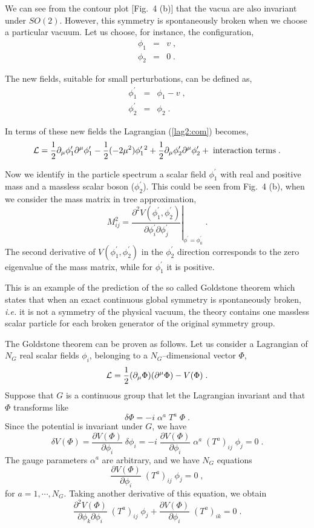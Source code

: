 \documentclass[12pt]{report}
\newcommand{\lag}{{\cal L}}
\newcommand{\del}{\partial}
\begin{document}
We can see from the contour plot [Fig.\ 4 (b)] that the vacua are
also invariant under $SO(2)$. However, this symmetry is spontaneously
broken when we choose a particular vacuum. Let us choose, for
instance, the configuration,
\begin{eqnarray*}
\phi_1 & = & v \; ,
\\
\phi_2 & = & 0 \; .
\end{eqnarray*}

The new fields, suitable for small perturbations, can be defined as,
\begin{eqnarray*}
\phi_1^\prime & = &  \phi_1 - v \; ,\\
\phi_2^\prime & = &  \phi_2 \; .
\end{eqnarray*}

In terms of these new fields the Lagrangian (\ref{lag2:com}) becomes,
\[ 
\lag = \frac{1}{2} \del_\mu \phi_1^\prime \del^\mu \phi_1^\prime
-  \frac{1}{2} ({ -2 \mu^2}) \phi_1^{\prime \; 2} +  \frac{1}{2}
\del_\mu \phi_2^\prime \del^\mu \phi_2^\prime  + \; \mbox{interaction
terms} \; .
\] 

Now we identify in the particle spectrum a scalar field
$\phi_1^\prime$ with real and positive mass and a massless scalar
boson ($\phi_2^\prime$). This could be seen from Fig.\ 4 (b), when we
consider the mass matrix in tree approximation,
\[
M_{ij}^2 = \left . \frac{\partial^2 V(\phi_1^\prime, \phi_2^\prime)}
              {\partial \phi_i^\prime\partial\phi_j^\prime} \right
              |_{\phi^\prime = \phi_0^\prime} \; .
\]
The second derivative of $V(\phi_1^\prime, \phi_2^\prime)$ in the
$\phi_2^\prime$ direction corresponds to the zero eigenvalue of the
mass matrix, while for $\phi_1^\prime$ it is positive.

This is an example of the prediction of the so called Goldstone
theorem \cite{Goldstone:61}  which states that when an exact
continuous global symmetry is spontaneously broken, {\it i.e.} it is
not a symmetry of the physical vacuum, the theory contains one
massless scalar particle for each broken generator of the original
symmetry group. 

The Goldstone theorem can be proven as follows. Let us consider a
Lagrangian of $N_G$ real scalar fields $\phi_i$, belonging to a
$N_G$--dimensional vector $\Phi$,
\[
\lag = \frac{1}{2} (\partial_\mu \Phi)(\partial^\mu \Phi) - V(\Phi) 
\; .
\]
Suppose that $G$ is a continuous group that let the Lagrangian
invariant and that $\Phi$ transforms like
\[
\delta \Phi = - i \; \alpha^a \; T^a \; \Phi \; .
\]
Since the potential is invariant under $G$, we have
\[
\delta V(\Phi) = \frac{\partial V(\Phi)}{\partial \phi_i} \; \delta
\phi_i = -i \; \frac{\partial V(\Phi)}{\partial \phi_i} \; \alpha^a
\; (T^a)_{ij} \; \phi_j = 0 \; .
\]
The gauge parameters $\alpha^a$ are arbitrary, and we have $N_G$
equations
\[
\frac{\partial V(\Phi)}{\partial \phi_i} \;  (T^a)_{ij} \; \phi_j = 0
\; ,
\]
for $a = 1, \cdots, N_G$. Taking another derivative of this equation, we
obtain
\[
\frac{\partial^2 V(\Phi)}{\partial \phi_k \partial\phi_i} \;
(T^a)_{ij} \; \phi_j + 
\frac{\partial V(\Phi)}{\partial \phi_i} \; (T^a)_{ik}  = 0 \; .
\]
\end{document}
